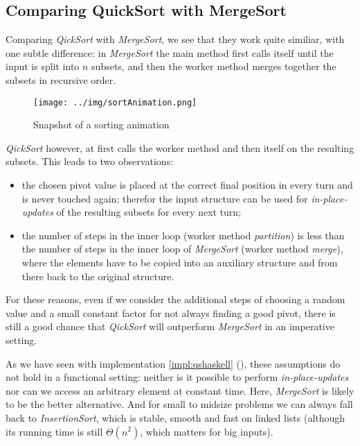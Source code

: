 \subsection{Comparing QuickSort with MergeSort}

Comparing \emph{QickSort} with \emph{MergeSort}, we see that they work quite similiar, with one subtle difference:
in \emph{MergeSort} the main method first calls itself until the input is split into $n$ subsets, and then the worker method merges together the subsets in recursive order.

\begin{figure}[h]
\centering
\texttt{[image: ../img/sortAnimation.png]}
\caption[Sorting in Action]{Snapshot of a sorting animation}
\end{figure}

\emph{QickSort} however, at first calls the worker method and then itself on the resulting subsets.
This leads to two observations:
\begin{itemize}
    \item the chosen pivot value is placed at the correct final position in every turn and is never touched again; therefor the input structure can be used for \emph{in-place-updates} of the resulting subsets for every next turn;
    \item the number of steps in the inner loop (worker method \emph{partition}) is less than the number of steps in the inner loop of \emph{MergeSort} (worker method \emph{merge}), where the elements have to be copied into an auxiliary structure and from there back to the original structure.
\end{itemize}


For these reasons, even if we consider the additional steps of choosing a random value and a small constant factor for not always finding a good pivot, there is still a good chance that \emph{QickSort} will outperform \emph{MergeSort} in an imperative setting.

As we have seen with implementation \ref{impl:qshaskell} (), these assumptions do not hold in a functional setting: neither is it possible to perform \emph{in-place-updates} nor can we access an arbitrary element at constant time.
Here, \emph{MergeSort} is likely to be the better alternative. 
And for small to midsize problems we can always fall back to \emph{InsertionSort}, which is stable, smooth and fast on linked lists (although its running time is still $\Theta (n^2)$, which matters for big inputs).

